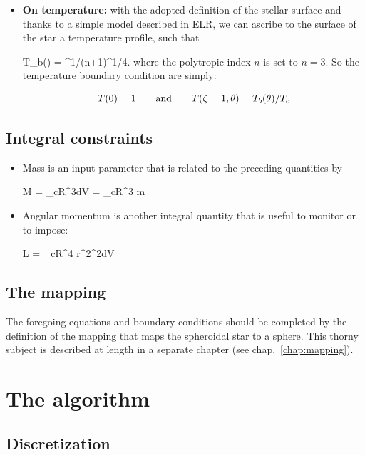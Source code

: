 \begin{itemize}
\item {\bf On temperature:} with the adopted definition of the stellar surface
and thanks to a simple model described in ELR, we can ascribe
to the surface of the star a temperature profile, such that

\beq T_b(\theta) = \lp{}\rp^{1/(n+1)}\lp{}\rp^{1/4}\;.
where the polytropic index $n$ is set to $n=3$. So the temperature
boundary condition are simply:

\[ T(0) = 1 \andet T(\zeta=1,\theta)=T_b(\theta)/T_c\]


\end{itemize}

\subsection{Integral constraints}

\begin{itemize}
\item Mass is an input parameter that is related to the preceding
quantities by

\beq M = \rho_cR^3\intvol \rho dV = \rho_cR^3 m

\item Angular momentum is another integral quantity that is useful to
monitor or to impose:

\beq L = \rho_cR^4
\intvol r^2\sin^2\theta\Omega\rho dV \eeq

\end{itemize}

\subsection{The mapping}

The foregoing equations and boundary conditions should be completed by
the definition of the mapping that maps the spheroidal star to a sphere.
This thorny subject is described at length in a separate chapter
(see chap.~\ref{chap:mapping}).

\section{The algorithm}

\subsection{Discretization}

